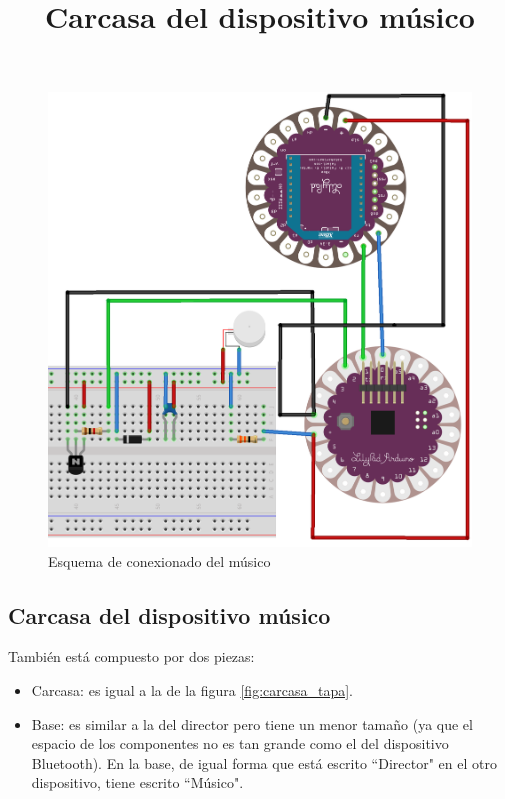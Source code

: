 \begin{figure}[!htb]
\centering
\includegraphics[width=1\textwidth]{./imagenes/musico_esquema}
\caption{Esquema de conexionado del músico} \label{fig:musico_esquema}
\end{figure}



\subsection{Carcasa del dispositivo músico}
\title{Carcasa del dispositivo músico}

También está compuesto por dos piezas:
\begin{itemize}
  \item Carcasa: es igual a la de la figura \ref{fig:carcasa_tapa}.
  \item Base: es similar a la del director pero tiene un menor tamaño (ya que el espacio
  de los componentes no es tan grande como el del dispositivo Bluetooth). En la base,
  de igual forma que está escrito ``Director" en el otro dispositivo, tiene escrito
  ``Músico".
\end{itemize}


